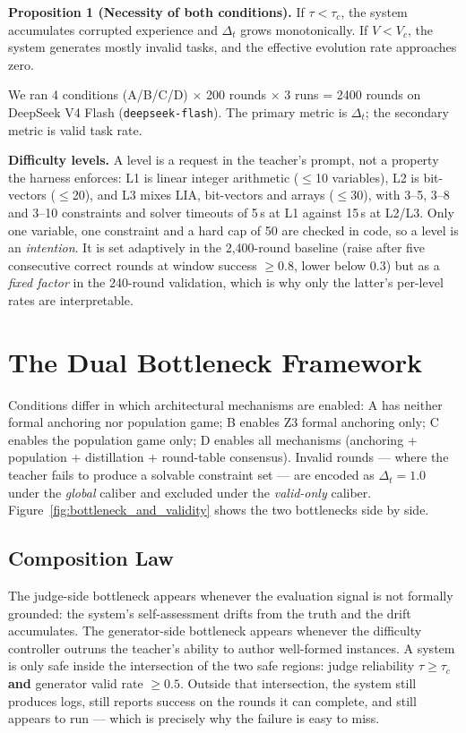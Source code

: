 \documentclass{article}
\begin{document}
\textbf{Proposition 1 (Necessity of both conditions).} If $\tau < \tau_c$, the system accumulates
corrupted experience and $\Delta_t$ grows monotonically. If $V < V_c$, the system generates mostly
invalid tasks, and the effective evolution rate approaches zero.

We ran 4 conditions (A/B/C/D) $\times$ 200 rounds $\times$ 3 runs = 2400 rounds on DeepSeek V4
Flash (\texttt{deepseek-flash}). The primary metric is $\Delta_t$; the secondary metric is valid task
rate.

\textbf{Difficulty levels.} A level is a request in the teacher's prompt, not a property the harness
enforces: L1 is linear integer arithmetic ($\le$10 variables), L2 is bit-vectors ($\le$20), and L3
mixes LIA, bit-vectors and arrays ($\le$30), with 3--5, 3--8 and 3--10 constraints and solver
timeouts of 5\,s at L1 against 15\,s at L2/L3. Only one variable, one constraint and a hard cap of 50
are checked in code, so a level is an \emph{intention}. It is set adaptively in the 2{,}400-round
baseline (raise after five consecutive correct rounds at window success $\ge 0.8$, lower below $0.3$)
but as a \emph{fixed factor} in the 240-round validation, which is why only the latter's per-level
rates are interpretable.

\section{The Dual Bottleneck Framework}

Conditions differ in which architectural mechanisms are enabled: A has neither formal anchoring nor
population game; B enables Z3 formal anchoring only; C enables the population game only; D enables all
mechanisms (anchoring + population + distillation + round-table consensus). Invalid rounds --- where
the teacher fails to produce a solvable constraint set --- are encoded as $\Delta_t = 1.0$ under the
\textit{global} caliber and excluded under the \textit{valid-only} caliber.
Figure~\ref{fig:bottleneck_and_validity} shows the two bottlenecks side by side.

\subsection{Composition Law}

The judge-side bottleneck appears whenever the evaluation signal is not formally grounded: the
system's self-assessment drifts from the truth and the drift accumulates. The generator-side
bottleneck appears whenever the difficulty controller outruns the teacher's ability to author
well-formed instances. A system is only safe inside the intersection of the two safe regions: judge
reliability $\tau \ge \tau_c$ \textbf{and} generator valid rate $\ge 0.5$. Outside that intersection,
the system still produces logs, still reports success on the rounds it can complete, and still
appears to run --- which is precisely why the failure is easy to miss.
\end{document}
